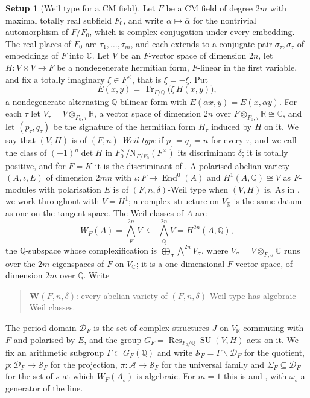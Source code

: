 \documentclass[11pt,reqno]{amsart}
\theoremstyle{plain}
\theoremstyle{definition}
\newtheorem{setupenv}[theorem]{Setup}
\theoremstyle{remark}
\newcommand{\QQ}{\mathbb{Q}}
\newcommand{\RR}{\mathbb{R}}
\newcommand{\CC}{\mathbb{C}}
\newcommand{\cA}{\mathcal{A}}
\newcommand{\cD}{\mathcal{D}}
\newcommand{\cS}{\mathcal{S}}
\newcommand{\Nm}{\mathrm{N}}             %
\DeclareMathOperator{\End}{End}
\DeclareMathOperator{\Res}{Res}
\DeclareMathOperator{\Tr}{Tr}
\DeclareMathOperator{\SU}{SU}
\newcommand{\bbar}[1]{\overline{#1}}
\begin{document}
\begin{setupenv}[Weil type for a CM field]\label{setup:cmfield}
Let $F$ be a CM field of degree $2m$ with maximal totally real subfield
$F_{0}$, and write $\alpha\mapsto\bbar\alpha$ for the nontrivial automorphism
of $F/F_{0}$, which is complex conjugation under every embedding. The real
places of $F_{0}$ are $\tau_{1},\dots,\tau_{m}$, and each extends to a
conjugate pair $\sigma_{\tau},\bbar\sigma_{\tau}$ of embeddings of $F$ into
$\CC$. Let $V$ be an $F$-vector space of dimension $2n$, let
$H\colon V\times V\to F$ be a nondegenerate hermitian form, $F$-linear in the
first variable, and fix a totally imaginary $\xi\in F^{\times}$, that is
$\bbar\xi=-\xi$. Put
\[
  E(x,y)=\Tr_{F/\QQ}\bigl(\xi\,H(x,y)\bigr),
\]
a nondegenerate alternating $\QQ$-bilinear form with
$E(\alpha x,y)=E(x,\bbar\alpha y)$. For each $\tau$ let
$V_{\tau}=V\otimes_{F_{0},\tau}\RR$, a vector space of dimension $2n$ over
$F\otimes_{F_{0},\tau}\RR\cong\CC$, and let $(p_{\tau},q_{\tau})$ be the
signature of the hermitian form $H_{\tau}$ induced by $H$ on it. We say that
$(V,H)$ is of \emph{$(F,n)$-Weil type} if $p_{\tau}=q_{\tau}=n$ for every
$\tau$, and we call the class of $(-1)^{n}\det H$ in
$F_{0}^{\times}/\Nm_{F/F_{0}}(F^{\times})$ its discriminant $\delta$; it is
totally positive, and for $F=K$ it is the discriminant of . A
polarised abelian variety $(A,\iota,E)$ of dimension $2mn$ with
$\iota\colon F\to\End^{0}(A)$ and $H^{1}(A,\QQ)\cong V$ as $F$-modules with
polarisation $E$ is of $(F,n,\delta)$-Weil type when $(V,H)$ is. As in
, we work throughout with $V=H^{1}$; a complex structure on
$V_{\RR}$ is the same datum as one on the tangent space. The Weil
classes of $A$ are
\[
  W_{F}(A)=\textstyle\bigwedge^{2n}_{F}V\;\subseteq\;\bigwedge^{2n}_{\QQ}V
  =H^{2n}(A,\QQ),
\]
the $\QQ$-subspace whose complexification is
$\bigoplus_{\sigma}\bigwedge^{2n}V_{\sigma}$, where $V_{\sigma}=V\otimes_{F,\sigma}\CC$
runs over the $2m$ eigenspaces of $F$ on $V_{\CC}$; it is a one-dimensional
$F$-vector space, of dimension $2m$ over $\QQ$. Write
\begin{quote}
$\mathbf{W}(F,n,\delta)$: every abelian variety of $(F,n,\delta)$-Weil type
has algebraic Weil classes.
\end{quote}
The period domain $\cD_{F}$ is the set of complex structures $J$ on
$V_{\RR}$ commuting with $F$ and polarised by $E$, and the group
$G_{F}=\Res_{F_{0}/\QQ}\SU(V,H)$ acts on it. We fix an arithmetic subgroup
$\Gamma\subset G_{F}(\QQ)$ and write $\cS_{F}=\Gamma\backslash\cD_{F}$ for the
quotient, $p\colon\cD_{F}\to\cS_{F}$ for the projection,
$\pi\colon\cA\to\cS_{F}$ for the universal family and
$\Sigma_{F}\subseteq\cD_{F}$ for the set of $s$ at which $W_{F}(A_{s})$ is
algebraic. For $m=1$ this is  and ,
with $\omega_{s}$ a generator of the line.
\end{setupenv}
\end{document}
